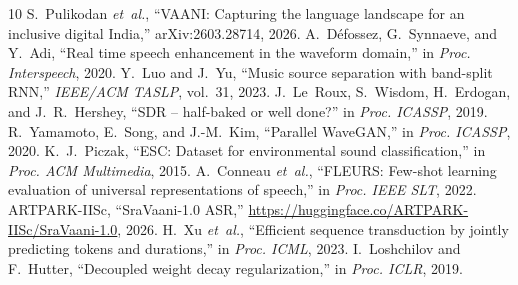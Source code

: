 \documentclass[conference]{IEEEtran}
\begin{document}

\begin{thebibliography}{10}\setlength{\itemsep}{0pt}\footnotesize
{} S.~Pulikodan \emph{et~al.}, ``VAANI: Capturing the language landscape for an inclusive digital India,'' arXiv:2603.28714, 2026.
 A.~D\'efossez, G.~Synnaeve, and Y.~Adi, ``Real time speech enhancement in the waveform domain,'' in \emph{Proc. Interspeech}, 2020.
 Y.~Luo and J.~Yu, ``Music source separation with band-split RNN,'' \emph{IEEE/ACM TASLP}, vol.~31, 2023.
 J.~Le~Roux, S.~Wisdom, H.~Erdogan, and J.~R.~Hershey, ``SDR -- half-baked or well done?'' in \emph{Proc. ICASSP}, 2019.
 R.~Yamamoto, E.~Song, and J.-M.~Kim, ``Parallel WaveGAN,'' in \emph{Proc. ICASSP}, 2020.
 K.~J.~Piczak, ``ESC: Dataset for environmental sound classification,'' in \emph{Proc. ACM Multimedia}, 2015.
 A.~Conneau \emph{et~al.}, ``FLEURS: Few-shot learning evaluation of universal representations of speech,'' in \emph{Proc. IEEE SLT}, 2022.
 ARTPARK-IISc, ``SraVaani-1.0 ASR,'' \url{https://huggingface.co/ARTPARK-IISc/SraVaani-1.0}, 2026.
 H.~Xu \emph{et~al.}, ``Efficient sequence transduction by jointly predicting tokens and durations,'' in \emph{Proc. ICML}, 2023.
 I.~Loshchilov and F.~Hutter, ``Decoupled weight decay regularization,'' in \emph{Proc. ICLR}, 2019.
\end{thebibliography}
\end{document}
